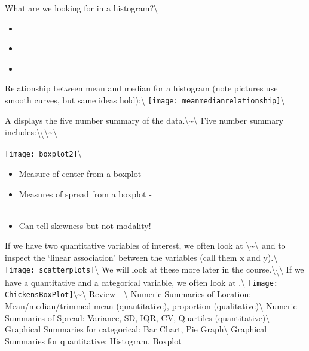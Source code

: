 \documentclass[]{book}
\begin{document}
What are we looking for in a histogram?\textbackslash{}

\begin{itemize}
\item ~\\
\item ~\\
\item ~
\end{itemize}\newpage

Relationship between mean and median for a histogram (note pictures use
smooth curves, but same ideas hold):\textbackslash{}
\texttt{[image: meanmedianrelationship]}\textbackslash{}

A \underbar{~~~~~~~~~~~~~~~~~~~~~~~~~~~~~~~~~~~~} displays the five
number summary of the
data.\textbackslash{}\textasciitilde{}\textbackslash{} Five number
summary
includes:\textbackslash{}\textsubscript{\textbackslash{}}\textbackslash{}\textasciitilde{}\textbackslash{}

\texttt{[image: boxplot2]}\textbackslash{}

\begin{itemize}
\item Measure of center from a boxplot - \\
\item Measures of spread from a boxplot - \\~\\
\item Can tell skewness but not modality!
\end{itemize}

If we have two quantitative variables of interest, we often look at
\underbar{~~~~~~~~~~~~~~~~~~~~~~~~~~~~~~~~~~~~~~~~~~~~~~~~~~~~~}
\textbackslash{}\textasciitilde{}\textbackslash{} and
\underbar{~~~~~~~~~~~~~~~~~~~~~~~~~~~~~~~~~~~~~~~~~~~~~~~~~~~~~} to
inspect the `linear association' between the variables (call them x and
y).\textbackslash{}
\texttt{[image: scatterplots]}\textbackslash{} We will look
at these more later in the
course.\textbackslash{}\textsubscript{\textbackslash{}}\textbackslash{}
If we have a quantitative and a categorical variable, we often look at
\underbar{~~~~~~~~~~~~~~~~~~~~~~~~~~~~~~~~~~~~~~~~~~~~~~~~~~~~~}.\textbackslash{}
\texttt{[image: ChickensBoxPlot]}\textbackslash{}\textasciitilde{}\textbackslash{}
Review - \textbackslash{} Numeric Summaries of Location:
Mean/median/trimmed mean (quantitative), proportion
(qualitative)\textbackslash{} Numeric Summaries of Spread: Variance, SD,
IQR, CV, Quartiles (quantitative)\textbackslash{} Graphical Summaries
for categorical: Bar Chart, Pie Graph\textbackslash{} Graphical
Summaries for quantitative: Histogram, Boxplot
\end{document}
